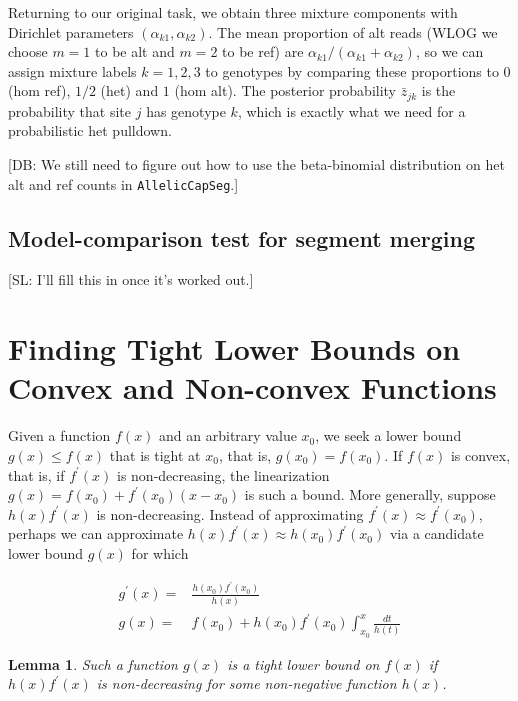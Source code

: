 \documentclass[nofootinbib,amssymb,amsmath]{revtex4}
\newcommand{\ACS}{\texttt{AllelicCapSeg}}
\newtheorem{lemma}{Lemma}
\def\SL#1{{\color [rgb]{0,0,0.8} [SL: #1]}}
\def\DB#1{{\color [rgb]{0,0.8,0} [DB: #1]}}
\begin{document}
Returning to our original task, we obtain three mixture components with Dirichlet parameters $(\alpha_{k1}, \alpha_{k2})$.  The mean proportion of alt reads (WLOG we choose $m = 1$ to be alt and $m=2$ to be ref) are $\alpha_{k1}/(\alpha_{k1} + \alpha_{k2})$, so we can assign mixture labels $k = 1, 2, 3$ to genotypes by comparing these proportions to $0$ (hom ref), $1/2$ (het) and $1$ (hom alt). The posterior probability $\bar{z}_{jk}$ is the probability that site $j$ has genotype $k$, which is exactly what we need for a probabilistic het pulldown.

\DB{We still need to figure out how to use the beta-binomial distribution on het alt and ref counts in \ACS.}



\subsection{Model-comparison test for segment merging} \label{likelihood-based-segment-merging}

\SL{I'll fill this in once it's worked out.}

\appendix

\section{Finding Tight Lower Bounds on Convex and Non-convex Functions} \label{bounds}

Given a function $f(x)$ and an arbitrary value $x_0$, we seek a lower bound $g(x) \le f(x)$ that is tight at $x_0$, that is, $g(x_0) = f(x_0)$.  If $f(x)$ is convex, that is, if $f^\prime(x)$ is non-decreasing, the linearization $g(x) = f(x_0) + f^\prime(x_0)(x-x_0)$ is such a bound.  More generally, suppose $h(x) f^\prime(x)$ is non-decreasing.  Instead of approximating $f^\prime(x) \approx f^\prime(x_0)$, perhaps we can approximate $h(x) f^\prime(x) \approx h(x_0) f^\prime(x_0)$ via a candidate lower bound $g(x)$ for which

\begin{align}
g^\prime(x) =& \frac{ h(x_0) f^\prime(x_0) } {h(x)} \\
g(x) =& f(x_0) + h(x_0) f^\prime(x_0)  \int_{x_0}^x \frac{d t}{h(t)}
\end{align}

\begin{lemma}
Such a function $g(x)$ is a tight lower bound on $f(x)$ if $h(x) f^\prime(x)$ is non-decreasing for some non-negative function $h(x)$.
\end{lemma}
\end{document}
